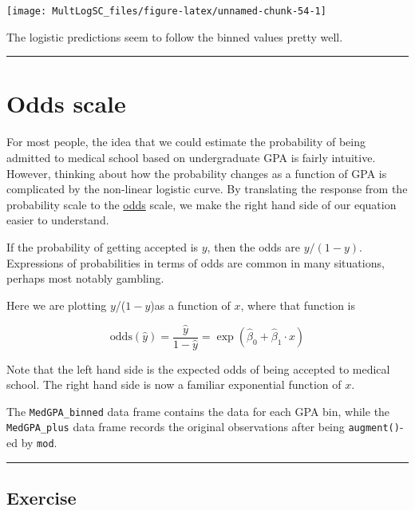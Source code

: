 \documentclass[]{book}
\begin{document}
\begin{center}\texttt{[image: MultLogSC\_files/figure-latex/unnamed-chunk-54-1]} \end{center}

The logistic predictions seem to follow the binned values pretty well.

\begin{center}\rule{0.5\linewidth}{\linethickness}\end{center}

\section{Odds scale}\label{odds-scale}

For most people, the idea that we could estimate the probability of
being admitted to medical school based on undergraduate GPA is fairly
intuitive. However, thinking about how the probability changes as a
function of GPA is complicated by the non-linear logistic curve. By
translating the response from the probability scale to the
\href{https://en.wikipedia.org/wiki/Odds}{odds} scale, we make the right
hand side of our equation easier to understand.

If the probability of getting accepted is \(y\), then the odds are
\(y/(1-y)\). Expressions of probabilities in terms of odds are common in
many situations, perhaps most notably gambling.

Here we are plotting \(y\)/(\(1-y\))as a function of \(x\), where that
function is

\begin{equation}
\text{odds}(\hat{y})=\frac{\hat{y}}{1 - \hat{y}}=\exp(\hat{\beta}_0 + \hat{\beta}_1 \cdot x)
\end{equation}

Note that the left hand side is the expected odds of being accepted to
medical school. The right hand side is now a familiar exponential
function of \(x\).

The \texttt{MedGPA\_binned} data frame contains the data for each GPA
bin, while the \texttt{MedGPA\_plus} data frame records the original
observations after being \texttt{augment()}-ed by \texttt{mod}.

\begin{center}\rule{0.5\linewidth}{\linethickness}\end{center}

\subsection*{Exercise}\label{exercise-17}
\end{document}
